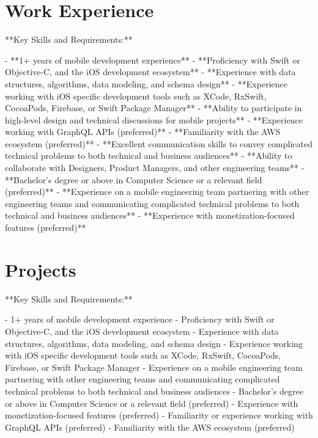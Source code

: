 \documentclass[letterpaper,11pt]{article}
\begin{document}
\section{Work Experience}
**Key Skills and Requirements:**

- **1+ years of mobile development experience**
- **Proficiency with Swift or Objective-C, and the iOS development ecosystem**
- **Experience with data structures, algorithms, data modeling, and schema design**
- **Experience working with iOS specific development tools such as XCode, RxSwift, CocoaPods, Firebase, or Swift Package Manager**
- **Ability to participate in high-level design and technical discussions for mobile projects**
- **Experience working with GraphQL APIs (preferred)**
- **Familiarity with the AWS ecosystem (preferred)**
- **Excellent communication skills to convey complicated technical problems to both technical and business audiences**
- **Ability to collaborate with Designers, Product Managers, and other engineering teams**
- **Bachelor's degree or above in Computer Science or a relevant field (preferred)**
- **Experience on a mobile engineering team partnering with other engineering teams and communicating complicated technical problems to both technical and business audiences**
- **Experience with monetization-focused features (preferred)**
\section{Projects}
**Key Skills and Requirements:**

- 1+ years of mobile development experience
- Proficiency with Swift or Objective-C, and the iOS development ecosystem
- Experience with data structures, algorithms, data modeling, and schema design
- Experience working with iOS specific development tools such as XCode, RxSwift, CocoaPods, Firebase, or Swift Package Manager
- Experience on a mobile engineering team partnering with other engineering teams and communicating complicated technical problems to both technical and business audiences
- Bachelor's degree or above in Computer Science or a relevant field (preferred)
- Experience with monetization-focused features (preferred)
- Familiarity or experience working with GraphQL APIs (preferred)
- Familiarity with the AWS ecosystem (preferred)
\end{document}
